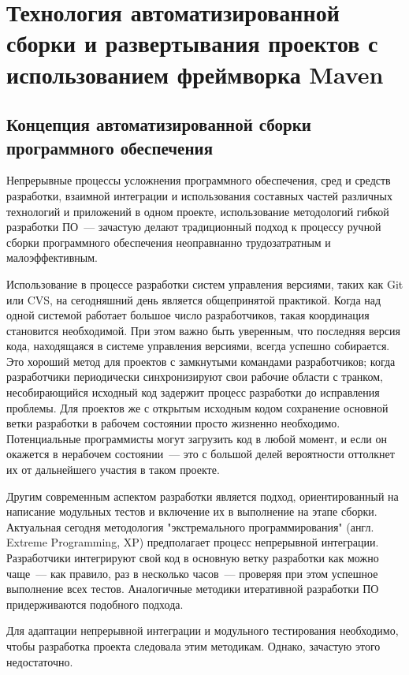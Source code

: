\updateStamp
{}
\section{Технология автоматизированной сборки и развертывания проектов с использованием фреймворка Maven}
\subsection{Концепция автоматизированной сборки программного обеспечения}
Непрерывные процессы усложнения программного обеспечения, сред и средств разработки, взаимной интеграции и использования составных частей различных технологий и приложений в одном проекте, использование методологий гибкой разработки ПО~--- зачастую делают традиционный подход к процессу ручной сборки программного обеспечения неоправнанно трудозатратным и малоэффективным.

Использование в процессе разработки систем управления версиями, таких как Git или CVS, на сегодняшний день является общепринятой практикой. Когда над одной системой работает большое число разработчиков, такая координация становится необходимой.  При этом важно быть уверенным, что последняя версия кода, находящаяся в системе управления версиями, всегда успешно собирается. Это хороший метод для проектов с замкнутыми командами разработчиков; когда разработчики периодически синхронизируют свои рабочие области с транком, несобирающийся исходный код задержит процесс разработки до исправления проблемы. Для проектов же с открытым исходным кодом сохранение основной ветки разработки в рабочем состоянии просто жизненно необходимо. Потенциальные программисты могут загрузить код в любой момент, и если он окажется в нерабочем состоянии~--- это с большой делей вероятности оттолкнет их от дальнейшего участия в таком проекте.

Другим современным аспектом разработки является подход, ориентированный на написание модульных тестов и включение их в выполнение на этапе сборки.
	Актуальная сегодня методология "экстремального программирования" (англ. Extreme Programming, XP) предполагает процесс непрерывной интеграции. Разработчики интегрируют свой код в основную ветку разработки как можно чаще~--- как правило, раз в несколько часов~--- проверяя при этом успешное выполнение всех тестов. Аналогичные методики итеративной разработки ПО придерживаются подобного подхода.

Для адаптации непрерывной интеграции и модульного тестирования необходимо, чтобы разработка проекта следовала этим методикам. Однако, зачастую этого недостаточно.

